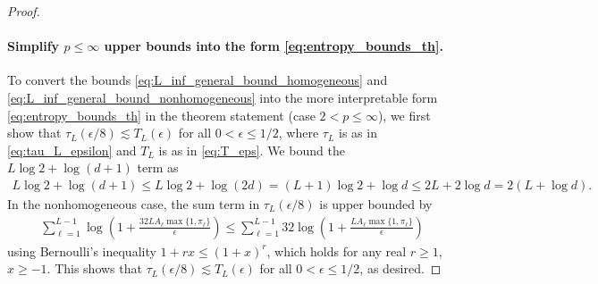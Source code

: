 \documentclass{article}
\begin{document}
\begin{appendices}
\begin{proof}
    \paragraph{Simplify $p \leq \infty$ upper bounds into the form \eqref{eq:entropy_bounds_th}.} To convert the bounds \eqref{eq:L_inf_general_bound_homogeneous} and \eqref{eq:L_inf_general_bound_nonhomogeneous} into the more interpretable form \eqref{eq:entropy_bounds_th} in the theorem statement (case $2 < p \leq \infty$), we first show that $\tau_L(\epsilon/8) \lesssim T_L(\epsilon)$ for all $0 < \epsilon \leq 1/2$, where $\tau_L$ is as in \eqref{eq:tau_L_epsilon} and $T_L$ is as in \eqref{eq:T_eps}. We bound the $L \log 2 + \log(d+1)$ term as
    \begin{align} \label{eq:L_log_d_homogeneous_lesssim_bound}
        L \log 2 + \log(d+1) \leq L \log 2 + \log(2d) = (L+1) \log 2 + \log d \leq 2L  + 2 \log d = 2(L + \log d).
    \end{align}
    In the nonhomogeneous case, the sum term in $\tau_L(\epsilon/8)$ is upper bounded by
    \begin{align}
        \sum_{\ell=1}^{L-1} \log \left( 1 + \frac{32 L A_\ell \max \{1, \pi_\ell \}}{\epsilon} \right) \leq \sum_{\ell=1}^{L-1} 32 \log \left( 1 + \frac{L A_\ell \max \{1, \pi_\ell \}}{\epsilon} \right)
    \end{align}
    using Bernoulli's inequality $1 + rx \leq (1+x)^r$, which holds for any real $r \geq 1$, $x \geq -1$. This shows that $\tau_L(\epsilon/8) \lesssim T_L(\epsilon)$ for all $0 < \epsilon \leq 1/2$, as desired.
    

\end{proof}
\end{appendices}
\end{document}
